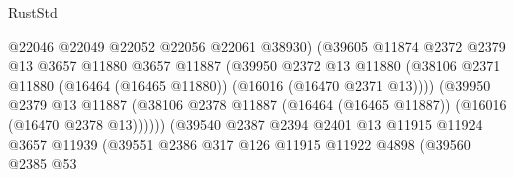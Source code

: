\begin{lexlean}{RustStd}
\begin{coremodule}
                                          @22046
                                          @22049
                                          @22052
                                          @22056
                                          @22061
                                          @38930)
                                        (@39605
                                          @11874
                                          @2372
                                          @2379
                                          @13
                                          @3657
                                          @11880
                                          @3657
                                          @11887
                                          (@39950
                                            @2372
                                            @13
                                            @11880
                                            (@38106
                                              @2371
                                              @11880
                                              (@16464 (@16465 @11880))
                                              (@16016 (@16470 @2371 @13))))
                                          (@39950
                                            @2379
                                            @13
                                            @11887
                                            (@38106
                                              @2378
                                              @11887
                                              (@16464 (@16465 @11887))
                                              (@16016 (@16470 @2378 @13))))))
                                      (@39540
                                        @2387
                                        @2394
                                        @2401
                                        @13
                                        @11915
                                        @11924
                                        @3657
                                        @11939
                                        (@39551
                                          @2386
                                          @317
                                          @126
                                          @11915
                                          @11922
                                          @4898
                                          (@39560
                                            @2385
                                            @53

\end{coremodule}
\end{lexlean}
